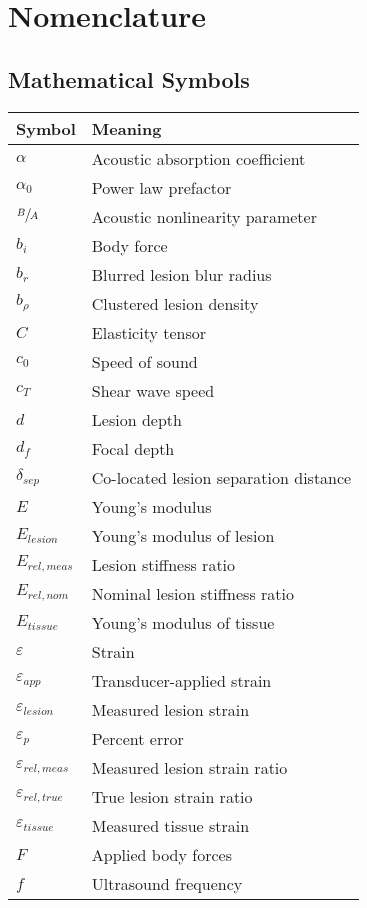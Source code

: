 \chapter*{Nomenclature}
	\section*{Mathematical Symbols}
		\begin{longtable}[l]{ll}
			Symbol & Meaning \\
			\hline \endhead
			$\alpha$ & Acoustic absorption coefficient \\
			$\alpha_0$ & Power law prefactor \\
			$\sfrac{B}{A}$ & Acoustic nonlinearity parameter \\
			$b_i$ & Body force \\
			$b_r$ & Blurred lesion blur radius \\
			$b_\rho$ & Clustered lesion density \\
			$C$ & Elasticity tensor \\
			$c_0$ & Speed of sound \\
			$c_T$ & Shear wave speed \\
			$d$ & Lesion depth \\
			$d_f$ & Focal depth \\
			$\delta_{sep}$ & Co-located lesion separation distance \\
			$E$ & Young's modulus \\
			$E_{lesion}$ & Young's modulus of lesion \\
			$E_{rel,meas}$ & Lesion stiffness ratio \\
			$E_{rel,nom}$ & Nominal lesion stiffness ratio \\
			$E_{tissue}$ & Young's modulus of tissue \\
			$\varepsilon$ & Strain \\
			$\varepsilon_{app}$ & Transducer-applied strain \\
			$\varepsilon_{lesion}$ & Measured lesion strain \\
			$\varepsilon_{p}$ & Percent error \\
			$\varepsilon_{rel,meas}$ & Measured lesion strain ratio \\
			$\varepsilon_{rel,true}$ & True lesion strain ratio \\
			$\varepsilon_{tissue}$ & Measured tissue strain \\
			$F$ & Applied body forces \\
			$f$ & Ultrasound frequency \\

\end{longtable}
